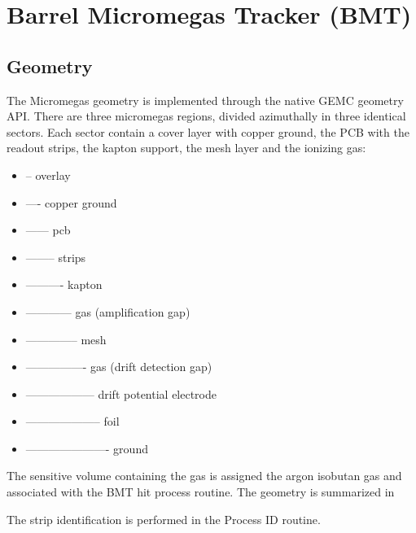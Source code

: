 \section{Barrel Micromegas Tracker (BMT)}

\subsection{Geometry}

The Micromegas geometry is implemented through the native GEMC geometry API.
There are three micromegas regions, divided azimuthally in three identical sectors. Each sector contain a cover layer with copper ground,
the PCB with the readout strips, the kapton support, the mesh layer and the ionizing gas:

\begin{itemize}
	\item -- overlay
	\item ---- copper ground
	\item ------ pcb
	\item -------- strips
	\item ---------- kapton
	\item ------------ gas (amplification gap)
	\item -------------- mesh
	\item ---------------- gas (drift detection gap)
	\item ------------------ drift potential electrode
	\item -------------------- foil
	\item ---------------------- ground
\end{itemize}

The sensitive volume containing the gas is assigned the argon isobutan gas and associated with the BMT hit process routine.
The geometry is summarized in 

The strip identification is performed in the Process ID routine.

